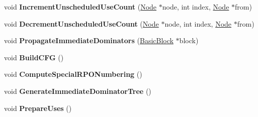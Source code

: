 \begin{DoxyCompactItemize}
\item 
void {\bfseries Increment\+Unscheduled\+Use\+Count} (\hyperlink{classv8_1_1internal_1_1compiler_1_1_node}{Node} $\ast$node, int index, \hyperlink{classv8_1_1internal_1_1compiler_1_1_node}{Node} $\ast$from)\hypertarget{classv8_1_1internal_1_1compiler_1_1_scheduler_a130d6450edb1f5790af1d86a395cc2a2}{}\label{classv8_1_1internal_1_1compiler_1_1_scheduler_a130d6450edb1f5790af1d86a395cc2a2}

\item 
void {\bfseries Decrement\+Unscheduled\+Use\+Count} (\hyperlink{classv8_1_1internal_1_1compiler_1_1_node}{Node} $\ast$node, int index, \hyperlink{classv8_1_1internal_1_1compiler_1_1_node}{Node} $\ast$from)\hypertarget{classv8_1_1internal_1_1compiler_1_1_scheduler_a07d0e3969d97fb571d4f89feee885c48}{}\label{classv8_1_1internal_1_1compiler_1_1_scheduler_a07d0e3969d97fb571d4f89feee885c48}

\item 
void {\bfseries Propagate\+Immediate\+Dominators} (\hyperlink{classv8_1_1internal_1_1compiler_1_1_basic_block}{Basic\+Block} $\ast$block)\hypertarget{classv8_1_1internal_1_1compiler_1_1_scheduler_a6726c9afa79bc98f1fcf830affcd0155}{}\label{classv8_1_1internal_1_1compiler_1_1_scheduler_a6726c9afa79bc98f1fcf830affcd0155}

\item 
void {\bfseries Build\+C\+FG} ()\hypertarget{classv8_1_1internal_1_1compiler_1_1_scheduler_ae0c0c9921a224e6db5638749e340ff02}{}\label{classv8_1_1internal_1_1compiler_1_1_scheduler_ae0c0c9921a224e6db5638749e340ff02}

\item 
void {\bfseries Compute\+Special\+R\+P\+O\+Numbering} ()\hypertarget{classv8_1_1internal_1_1compiler_1_1_scheduler_a2f140ed9f68b435d6006997d0e67c674}{}\label{classv8_1_1internal_1_1compiler_1_1_scheduler_a2f140ed9f68b435d6006997d0e67c674}

\item 
void {\bfseries Generate\+Immediate\+Dominator\+Tree} ()\hypertarget{classv8_1_1internal_1_1compiler_1_1_scheduler_a49e05f2f86f91fa0737564284f4825e9}{}\label{classv8_1_1internal_1_1compiler_1_1_scheduler_a49e05f2f86f91fa0737564284f4825e9}

\item 
void {\bfseries Prepare\+Uses} ()\hypertarget{classv8_1_1internal_1_1compiler_1_1_scheduler_a358ae5f1fe80555129fe0e02bdb7772b}{}\label{classv8_1_1internal_1_1compiler_1_1_scheduler_a358ae5f1fe80555129fe0e02bdb7772b}


\end{DoxyCompactItemize}
